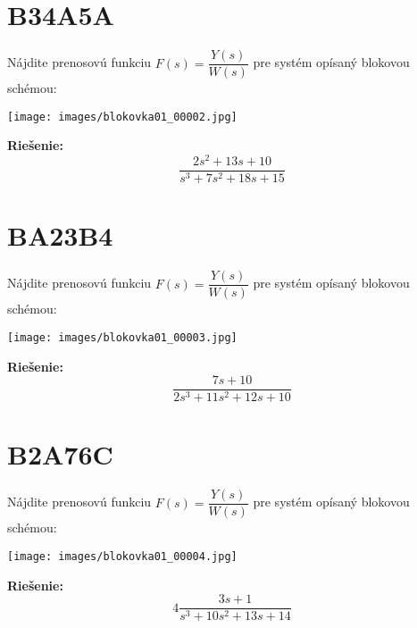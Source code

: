 \documentclass[a4paper, 12pt]{article}
\newenvironment{task}{}{}
\newenvironment{solution}{\noindent\textbf{Riešenie:}}{}
\begin{document}
\section*{B34A5A}
\begin{task}
    Nájdite prenosovú funkciu $F(s)=\dfrac{Y(s)}{W(s)}$ pre systém opísaný blokovou schémou:

    \texttt{[image: images/blokovka01\_00002.jpg]}
\end{task}

\begin{solution}
    \begin{equation*}
        \dfrac{2s^2+13s+10}{s^3+7s^2+18s+15}
    \end{equation*}
\end{solution}

\section*{BA23B4}
\begin{task}
    Nájdite prenosovú funkciu $F(s)=\dfrac{Y(s)}{W(s)}$ pre systém opísaný blokovou schémou:

    \texttt{[image: images/blokovka01\_00003.jpg]}
\end{task}

\begin{solution}
    \begin{equation*}
        \dfrac{7s+10}{2s^3+11s^2+12s+10}
    \end{equation*}
\end{solution}

\section*{B2A76C}
\begin{task}
    Nájdite prenosovú funkciu $F(s)=\dfrac{Y(s)}{W(s)}$ pre systém opísaný blokovou schémou:

    \texttt{[image: images/blokovka01\_00004.jpg]}
\end{task}

\begin{solution}
    \begin{equation*}
        4\dfrac{3s+1}{s^3+10s^2+13s+14}
    \end{equation*}
\end{solution}
\end{document}
